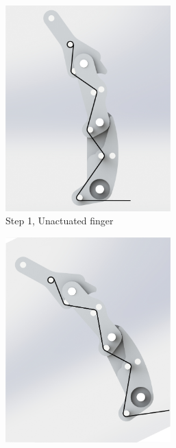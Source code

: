 \begin{figure}
    \centering
    \begin{subfigure}{.45\linewidth}
        \centering
    \includegraphics[width=0.7\textwidth]{Images/wirerouting/routing1.png}
        \caption{Step 1, Unactuated finger}
        \label{fig:routing1}
    \end{subfigure}
    \begin{subfigure}{.45\linewidth}
        \centering
        \includegraphics[width=0.7\textwidth]{Images/wirerouting/routing2.png}

\end{subfigure}
\end{figure}
